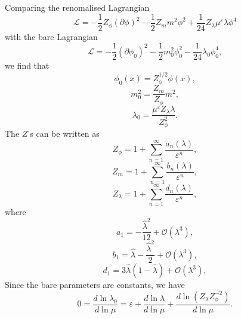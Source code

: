 \begin{solution}
    Comparing the renomalised Lagrangian
    \begin{equation}
        \mathcal{L} = -\frac{1}{2}Z_\phi(\partial \phi)^2 - \frac{1}{2}Z_mm^2\phi^2 + \frac{1}{24}Z_\lambda\mu^\varepsilon\lambda\phi^4
    \end{equation}
    with the bare Lagrangian
    \begin{equation}
        \mathcal{L} = -\frac{1}{2}(\partial\phi_0)^2 - \frac{1}{2}m_0^2\phi_0^2 - \frac{1}{24}\lambda_0\phi_0^4,
    \end{equation}
    we find that
    \begin{equation}
        \phi_0(x) = Z_\phi^{1/2}\phi(x),
    \end{equation}
    \begin{equation}
        m_0^2 = \frac{Z_m}{Z_\phi}m^2,
    \end{equation}
    \begin{equation}
        \lambda_0 = \frac{\mu^\varepsilon Z_\lambda\lambda}{Z_\phi^2}.
    \end{equation}
    The $Z$'s can be written as
    \begin{equation}
        Z_\phi = 1+ \sum_{n=1}^\infty\frac{a_n(\lambda)}{\varepsilon^n},
    \end{equation}
    \begin{equation}
        Z_m = 1+ \sum_{n=1}^\infty\frac{b_n(\lambda)}{\varepsilon^n},
    \end{equation}
    \begin{equation}
        Z_\lambda = 1+ \sum_{n=1}^\infty\frac{d_n(\lambda)}{\varepsilon^n},
    \end{equation}
    where 
    \begin{equation}
        a_1 = -\frac{\hat{\lambda}^2}{12} + \mathcal{O}(\lambda^3),
    \end{equation}
    \begin{equation}
        b_1 = \hat{\lambda} - \frac{\hat{\lambda}^2}{2} + \mathcal{O}(\lambda^3),
    \end{equation}
    \begin{equation}
        d_1 = 3\hat{\lambda}(1 - \hat{\lambda})  + \mathcal{O}(\lambda^3),
    \end{equation}
    Since the bare parameters are constants, we have
    \begin{equation}
        0 = \frac{d\ln \lambda_0}{d\ln\mu} = \varepsilon + \frac{d\ln\lambda}{d\ln\mu} + \frac{d\ln(Z_\lambda Z_\phi^{-2})}{d\ln\mu}.
    \end{equation}

\end{solution}
